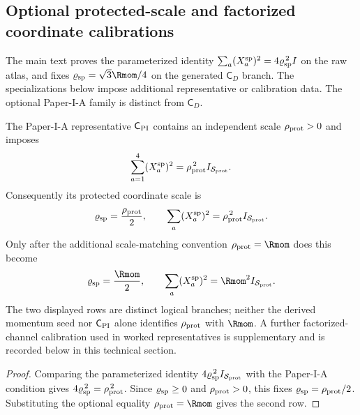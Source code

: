 \documentclass[11pt,a4paper]{article}
\begin{document}
\subsection{Optional protected-scale and factorized coordinate calibrations}
\label{p2e:app:optional-calibration}
The main text proves the parameterized identity
\(\sum_a(X_a^{\rm sp})^2=4\varrho_{\rm sp}^{\,2}I\) on the raw atlas,
and fixes \(\varrho_{\rm sp}=\sqrt3\Rmom/4\) on the generated
\(\mathsf C_D\) branch.  The specializations below impose additional
representative or calibration data.  The optional Paper-I-A family is
distinct from \(\mathsf C_D\).

\begin{corollary}
\label{p2e:cor:protected-scale-branches}
The Paper-I-A representative \(\mathsf C_{\rm PI}\) contains an independent
scale \(\rho_{\rm prot}>0\) and imposes
\[
        \sum_{a=1}^4(X_a^{\rm sp})^2
        =\rho_{\rm prot}^{\,2}I_{\mathcal S_{\rm prot}}.
\]
Consequently its protected coordinate scale is
\[
        \varrho_{\rm sp}=\frac{\rho_{\rm prot}}2,
        \qquad
        \sum_a(X_a^{\rm sp})^2
        =\rho_{\rm prot}^{\,2}I_{\mathcal S_{\rm prot}}.
\]
Only after the additional scale-matching convention
\(\rho_{\rm prot}=\Rmom\) does this become
\[
        \varrho_{\rm sp}=\frac{\Rmom}{2},
        \qquad
        \sum_a(X_a^{\rm sp})^2=\Rmom^2I_{\mathcal S_{\rm prot}}.
\]
The two displayed rows are distinct logical branches; neither the derived
momentum seed nor \(\mathsf C_{\rm PI}\) alone identifies
\(\rho_{\rm prot}\) with \(\Rmom\).  A further factorized-channel
calibration used in worked representatives is supplementary and is recorded
below in this technical section.
\end{corollary}

\begin{proof}
Comparing the parameterized identity
\(4\varrho_{\rm sp}^{\,2}I_{\mathcal S_{\rm prot}}\) with the Paper-I-A condition gives
\(4\varrho_{\rm sp}^{\,2}=\rho_{\rm prot}^{\,2}\).  Since
\(\varrho_{\rm sp}\ge0\) and \(\rho_{\rm prot}>0\), this fixes
\(\varrho_{\rm sp}=\rho_{\rm prot}/2\).  Substituting the optional equality
\(\rho_{\rm prot}=\Rmom\) gives the second row.
\end{proof}
\end{document}
